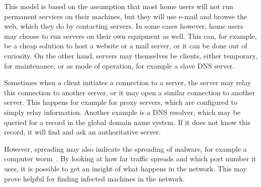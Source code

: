 This model is based on the assumption that most home users will not run permanent services on their machines,
 but they will use e-mail and browse the web, which they do by contacting servers.
In some cases however, home users may choose to run servers on their own equipment as well.
This can, for example, be a cheap solution to host a website or a mail server, or it can be done out of curiosity.
On the other hand, servers may themselves be clients, either temporary, for maintenance, or as mode of operation, for example a slave DNS server.

Sometimes when a client initiates a connection to a server,
 the server may relay this connection to another server, or it may open a similar connection to another server.
This happens for example for proxy servers, which are configured to simply relay information.
Another example is a DNS resolver, which may be queried for a record in the global domain name system.
If it does not know this record, it will find and ask an authoritative server.

However, spreading may also indicate the spreading of malware, for example a computer worm~\cite{pastor2001epidemic}.
By looking at how far traffic spreads and which port number it uses,
 it is possible to get an insight of what happens in the network.
This may prove helpful for finding infected machines in the network.

